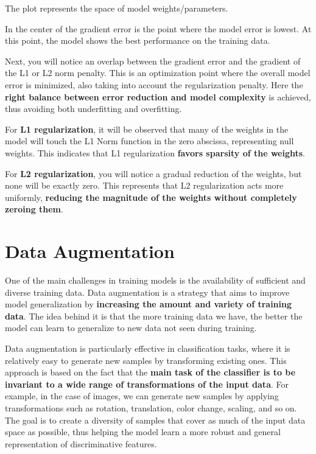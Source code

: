 The plot represents the space of model weights/parameters.

In the center of the gradient error is the point where the model error is lowest. At this point, the model shows the best performance on the training data.

Next, you will notice an overlap between the gradient error and the gradient of the L1 or L2 norm penalty. This is an optimization point where the overall model error is minimized, also taking into account the regularization penalty. Here the \textbf{right balance between error reduction and model complexity} is achieved, thus avoiding both underfitting and overfitting.

For \textbf{\textcolor{mygreen}{L1 regularization}}, it will be observed that many of the weights in the model will touch the L1 Norm function in the zero abscissa, representing null weights. This indicates that L1 regularization \textbf{favors sparsity of the weights}.

For \textbf{\textcolor{myred}{L2 regularization}}, you will notice a gradual reduction of the weights, but none will be exactly zero. This represents that L2 regularization acts more uniformly, \textbf{reducing the magnitude of the weights without completely zeroing them}.

\section{Data Augmentation}

One of the main challenges in training models is the availability of sufficient and diverse training data. Data augmentation is a strategy that aims to improve model generalization by \textbf{increasing the amount and variety of training data}. The idea behind it is that the more training data we have, the better the model can learn to generalize to new data not seen during training.

Data augmentation is particularly effective in classification tasks, where it is relatively easy to generate new samples by transforming existing ones. This approach is based on the fact that the \textbf{main task of the classifier is to be invariant to a wide range of transformations of the input data}. For example, in the case of images, we can generate new samples by applying transformations such as rotation, translation, color change, scaling, and so on. The goal is to create a diversity of samples that cover as much of the input data space as possible, thus helping the model learn a more robust and general representation of discriminative features.
    
